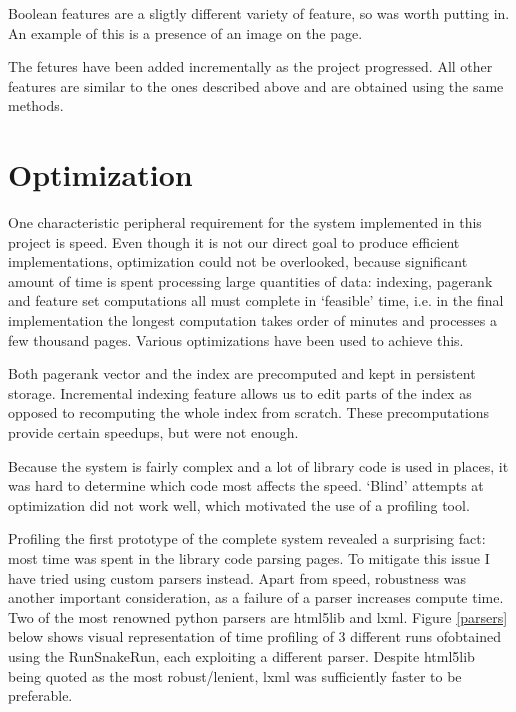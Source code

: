\documentclass[12pt,twoside,notitlepage]{report}
\begin{document}
Boolean features are a sligtly different variety of feature, so was worth
putting in. An example of this is a presence of an image on the page.

The fetures have been added incrementally as the project progressed. All other
features are similar to the ones described above and are obtained using the
same methods.


\section{Optimization}

One characteristic peripheral requirement for the system implemented in this
project is speed.  Even though it is not our direct goal to produce efficient
implementations, optimization could not be overlooked, because significant amount of
time is spent processing large quantities of data: indexing, pagerank
and feature set computations all must complete in `feasible' time, i.e. in the
final implementation the longest computation takes order of minutes and
processes a few thousand pages. Various optimizations have been used to achieve
this.

Both pagerank vector and the index are precomputed and kept in persistent
storage. Incremental indexing feature allows us to edit parts of the index as
opposed to recomputing the whole index from scratch. These precomputations
provide certain speedups, but were not enough.

Because the system is fairly complex and a lot of library code is used in
places, it was hard to determine which code most affects the speed. `Blind'
attempts at optimization did not work well, which motivated the use of a
profiling tool.

Profiling the first prototype of the complete system revealed a surprising
fact: most time was spent in the library code parsing pages. To mitigate this
issue I have tried using custom parsers instead. Apart from speed, robustness
was another important consideration, as a failure of a parser increases compute
time. Two of the most renowned python parsers are html5lib and lxml. 
Figure \ref{parsers} below shows visual representation of time profiling
of 3 different runs ofobtained using the RunSnakeRun, each exploiting a
different parser. 
Despite html5lib being quoted as the most robust/lenient, lxml was sufficiently
faster to be preferable.
\end{document}
